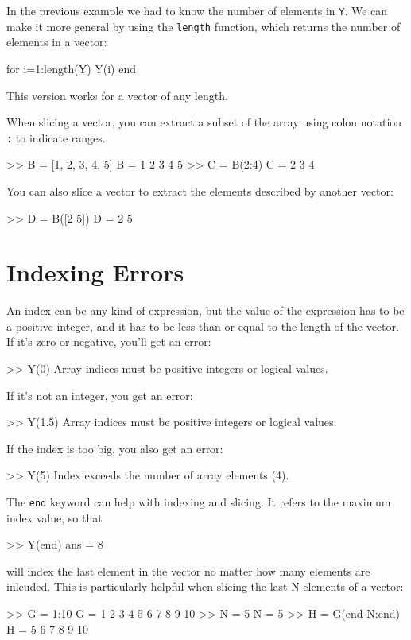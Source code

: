 In the previous example we had to know the number
of elements in \lstinline{Y}.  We can make it more general by using
the \lstinline{length} function, which returns the number of elements
in a vector:

\begin{code}
for i=1:length(Y)
     Y(i)
end
\end{code}

This version works for a vector of any length.

When slicing a vector, you can extract a subset of the array using colon notation \lstinline{:} to indicate ranges.
\begin{code}
    >> B = [1, 2, 3, 4, 5]
    B =
         1     2     3     4     5
    >> C = B(2:4)
    C =
         2     3     4
\end{code}

You can also slice a vector to extract the elements described by another vector:
\begin{code}
    >> D = B([2 5])
    D =
         2     5
\end{code}

\section{Indexing Errors}


An index can be any kind of expression, but the value of the
expression has to be a positive integer, and it has to be
less than or equal to the length of the vector.  If it's
zero or negative, you'll get an error:

\begin{code}
>> Y(0)
Array indices must be positive integers or logical values.
\end{code}

If it's not an integer, you get an error:

\begin{code}
>> Y(1.5)
Array indices must be positive integers or logical values.
\end{code}

If the index is too big, you also get an error:

\begin{code}
>> Y(5)
Index exceeds the number of array elements (4).
\end{code}

The \lstinline{end} keyword can help with indexing and slicing.  It refers to the maximum index value, so that
\begin{code}
    >> Y(end)
    ans =
         8
\end{code}
will index the last element in the vector no matter how many elements are inlcuded.  This is particularly helpful when slicing the last N elements of a vector:
\begin{code}
    >> G = 1:10
    G =
         1     2     3     4     5     6     7     8     9    10
    >> N = 5
    N =
         5
    >> H = G(end-N:end)
    H =
         5     6     7     8     9    10
\end{code}

